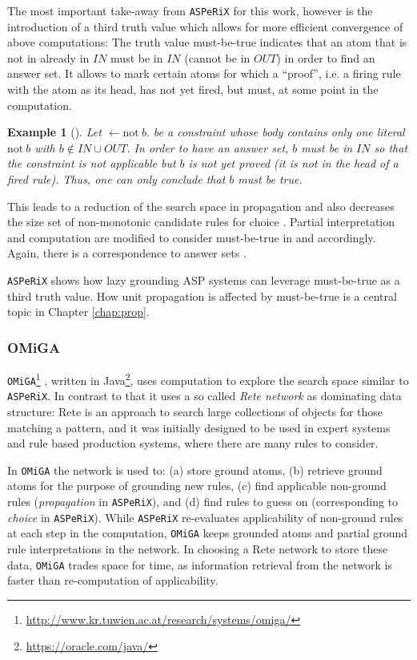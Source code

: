 \documentclass{vutinfth} %
\newtheorem{example}{Example}[chapter]
\newcommand{\mbt}{must-be-true\xspace}
\newcommand{\fail}{\mathrm{not } \ \xspace}
\newcommand{\from}{\ensuremath{\leftarrow}}
\newcommand{\asperix}{\texttt{ASPeRiX}\xspace}
\newcommand{\omiga}{\texttt{OMiGA}\xspace}
\begin{document}
The most important take-away from \asperix for this work, however is the introduction of a third truth value which allows for more efficient convergence of above computations: The truth value \mbt indicates that an atom that is not in already in $IN$ must be in $IN$ (cannot be in $OUT$) in order to find an answer set. It allows to mark certain atoms for which a \enquote{proof}, i.e. a firing rule with the atom as its head, has not yet fired, but must, at some point in the computation.

\begin{example}[{\cite[Example 7]{asperix}}]
\label{ex:mbt}
Let $\from \fail b.$ be a constraint whose body contains only one literal $\fail b$ with $b \not \in IN \cup OUT$. In order to have an answer set, $b$ must be in $IN$ so that the constraint is not applicable but $b$ is not yet proved (it is not in the head of a fired rule). Thus, one can only conclude that $b$ must be true.
\end{example}

This leads to a reduction of the search space in propagation \cite[Ex.~8]{asperix} and also decreases the size set of non-monotonic candidate rules for choice \cite[Ex.~9]{asperix}. Partial interpretation and computation are modified to consider \mbt in \cite[Def.~8]{asperix} and \cite[Def.~11]{asperix} accordingly. Again, there is a correspondence to answer sets \cite[Thm.~3]{asperix}.

\asperix shows how lazy grounding ASP systems can leverage \mbt as a third truth value. How unit propagation is affected by \mbt is a central topic in Chapter \ref{chap:prop}.

\subsubsection{OMiGA}
\label{sec:omiga}

\omiga\footnote{\url{http://www.kr.tuwien.ac.at/research/systems/omiga/}} \cite{omiga}, written in Java\footnote{\url{https://oracle.com/java/}}, uses computation to explore the search space similar to \asperix. In contrast to that it uses a so called \emph{Rete network} \cite{rete} as dominating data structure: Rete is an approach to search large collections of objects for those matching a pattern, and it was initially designed to be used in expert systems and rule based production systems, where there are many rules to consider.

In \omiga the network is used to: (a) store ground atoms, (b) retrieve ground atoms for the purpose of grounding new rules, (c) find applicable non-ground rules (\emph{propagation} in \asperix), and (d) find rules to guess on (corresponding to \emph{choice} in \asperix). While \asperix re-evaluates applicability of non-ground rules at each step in the computation, \omiga keeps grounded atoms and partial ground rule interpretations in the network. In choosing a Rete network to store these data, \omiga trades space for time, as information retrieval from the network is faster than re-computation of applicability. 
\end{document}
